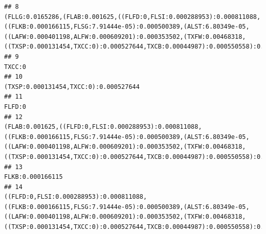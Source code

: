 \documentclass[]{article}
\begin{document}
\begin{verbatim}
## 8                                                               (FLLG:0.0165286,(FLAB:0.001625,((FLFD:0,FLSI:0.000288953):0.000811088,((FLKB:0.000166115,FLSG:7.91444e-05):0.000500389,(ALST:6.80349e-05,((LAFW:0.000401198,ALFW:0.000609201):0.000353502,(TXFW:0.00468318,((TXSP:0.000131454,TXCC:0):0.000527644,TXCB:0.00044987):0.000550558):0.00263375):0.000535248):0.0026018):0.000242145):0.00153256):0.00951218):0.00146329
## 9                                                                                                                                                                                                                                                                                                                                                                                                                            TXCC:0
## 10                                                                                                                                                                                                                                                                                                                                                                                            (TXSP:0.000131454,TXCC:0):0.000527644
## 11                                                                                                                                                                                                                                                                                                                                                                                                                           FLFD:0
## 12                                                                                          (FLAB:0.001625,((FLFD:0,FLSI:0.000288953):0.000811088,((FLKB:0.000166115,FLSG:7.91444e-05):0.000500389,(ALST:6.80349e-05,((LAFW:0.000401198,ALFW:0.000609201):0.000353502,(TXFW:0.00468318,((TXSP:0.000131454,TXCC:0):0.000527644,TXCB:0.00044987):0.000550558):0.00263375):0.000535248):0.0026018):0.000242145):0.00153256):0.00951218
## 13                                                                                                                                                                                                                                                                                                                                                                                                                 FLKB:0.000166115
## 14                                                                                                                     ((FLFD:0,FLSI:0.000288953):0.000811088,((FLKB:0.000166115,FLSG:7.91444e-05):0.000500389,(ALST:6.80349e-05,((LAFW:0.000401198,ALFW:0.000609201):0.000353502,(TXFW:0.00468318,((TXSP:0.000131454,TXCC:0):0.000527644,TXCB:0.00044987):0.000550558):0.00263375):0.000535248):0.0026018):0.000242145):0.00153256

\end{verbatim}
\end{document}

